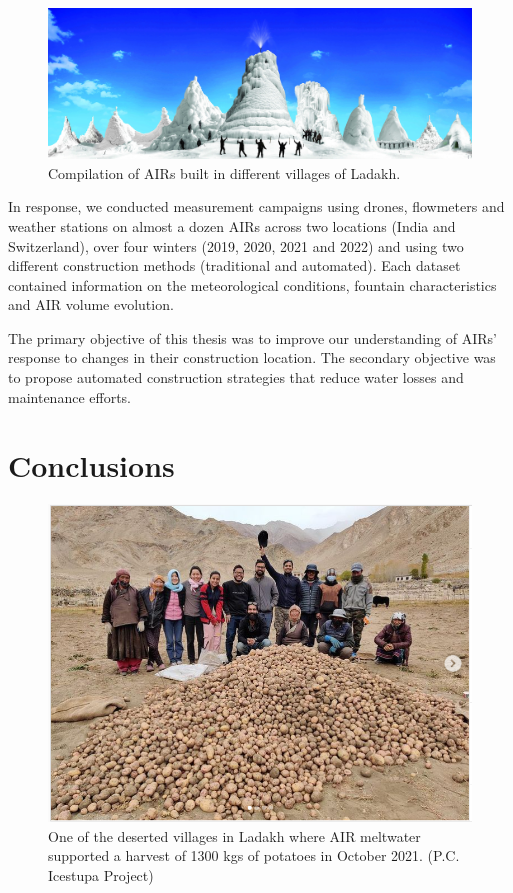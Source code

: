 \begin{figure}[htb]
	\includegraphics[width=\textwidth]{figs/AIRs_Ladakh}
	\caption{Compilation of AIRs built in different villages of Ladakh.}
	\label{fig:airs_ladakh}
\end{figure}


In response, we conducted measurement campaigns using drones, flowmeters and weather stations on almost a dozen
AIRs across two locations (India and Switzerland), over four winters (2019, 2020, 2021 and 2022) and using two
different construction methods (traditional and automated). Each dataset contained information on the
meteorological conditions, fountain characteristics and AIR volume evolution. 

The primary objective of this thesis was to improve our understanding of AIRs' response to changes in
their construction location. The secondary objective was to propose automated construction strategies that reduce
water losses and maintenance efforts. 

\section{Conclusions}

\begin{figure}[htb]
	\includegraphics[width=\textwidth]{figs/Kullum_potatoes}
	\caption{One of the deserted villages in Ladakh where AIR meltwater supported a harvest of 1300 kgs of
  potatoes in October 2021. (P.C. Icestupa Project)}
	\label{fig:kullum_potatoes}
\end{figure}

